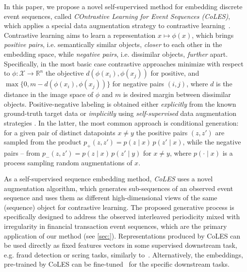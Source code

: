 \documentclass[sigconf, anonymous]{acmart}
\begin{document}
In this paper, we propose a novel self-supervised method for embedding discrete event
sequences, called \emph{COntrastive Learning for Event Sequences (CoLES)}, which applies
a special data augmentation strategy to contrastive learning~\citep{Xing2002DistanceML, Hadsell2006DimensionalityRB}.
% 
Contrastive learning aims to learn a representation $x \mapsto \phi(x)$, which brings
\emph{positive pairs}, i.e. semantically similar objects, \emph{closer} to each other
in the embedding space, while \emph{negative pairs}, i.e. dissimilar objects, \emph{further}
apart. Specifically, in the most basic case contrastive approaches minimize with respect to $
    \phi \colon \mathcal{X} \to \mathbb{R}^n
$ the objective $
    d(\phi(x_i), \phi(x_j))
$ for positive, and $
    \max\bigl\{0, m - d(\phi(x_i), \phi(x_j)) \bigr\}
$ for negative pairs $(i, j)$, where $d$ is the distance in the image space of $\phi$ and
$m$ is desired margin between dissimilar objects.
%
Positive-negative labeling is obtained either \emph{explicitly} from the known ground-truth
target data or \emph{implicitly} using \emph{self-supervised} data augmentation strategies
\citep{Falcon2020AFF}. In the latter, the most common approach is conditional generation:
for a given pair of distinct datapoints $x \neq y$ the positive pairs $(z, z')$ are sampled
from the product $
  p_+(z, z') = p(z \mid x) \,p(z' \mid x) 
$, while the negative pairs -- from $
  p_-(z, z') = p(z \mid x) \,p(z' \mid y)
$ for $x \neq y$, where $
  p(\cdot \mid x)
$ is a process sampling random augmentations of $x$.

As a self-supervised sequence embedding method, \emph{CoLES} uses a novel augmentation
algorithm, which generates sub-sequences of an observed event sequence and uses them as
different high-dimensional views of the same (sequence) object for contrastive learning.
%
The proposed generative process is specifically designed to address the observed interleaved
periodicity mixed with irregularity in financial transaction event sequences, which are
the primary application of our method (see \ref{sec:}). Representations produced by CoLES
can be used directly as fixed features vectors in some supervised downstream task, e.g.
fraud detection or scring tasks, similarly to~\citep{Mikolov2013EfficientEO, Song2017LearningUE, Zhai2019LearningAU}.
%
Alternatively, the embeddings, pre-trained by CoLES can be fine-tuned~\citep{Yosinski2014HowTA}
for the specific downstream tasks.
\end{document}
